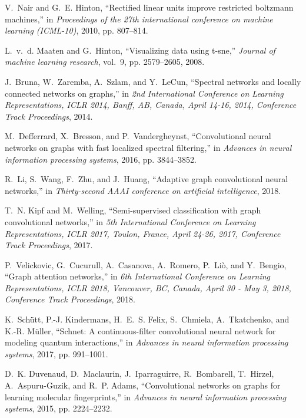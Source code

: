 \documentclass[11pt,dvipdfm]{article}
\begin{document}
\begin{thebibliography}{10}
\begin{small}
V.~Nair and G.~E. Hinton, ``Rectified linear units improve restricted boltzmann
  machines,'' in \emph{Proceedings of the 27th international conference on
  machine learning (ICML-10)}, 2010, pp. 807--814.

L.~v.~d. Maaten and G.~Hinton, ``Visualizing data using t-sne,'' \emph{Journal
  of machine learning research}, vol.~9, pp. 2579--2605, 2008.

J.~Bruna, W.~Zaremba, A.~Szlam, and Y.~LeCun, ``Spectral networks and locally
  connected networks on graphs,'' in \emph{2nd International Conference on
  Learning Representations, {ICLR} 2014, Banff, AB, Canada, April 14-16, 2014,
  Conference Track Proceedings}, 2014.

M.~Defferrard, X.~Bresson, and P.~Vandergheynst, ``Convolutional neural
  networks on graphs with fast localized spectral filtering,'' in
  \emph{Advances in neural information processing systems}, 2016, pp.
  3844--3852.

R.~Li, S.~Wang, F.~Zhu, and J.~Huang, ``Adaptive graph convolutional neural
  networks,'' in \emph{Thirty-second AAAI conference on artificial
  intelligence}, 2018.

T.~N. Kipf and M.~Welling, ``Semi-supervised classification with graph
  convolutional networks,'' in \emph{5th International Conference on Learning
  Representations, {ICLR} 2017, Toulon, France, April 24-26, 2017, Conference
  Track Proceedings}, 2017.

P.~Velickovic, G.~Cucurull, A.~Casanova, A.~Romero, P.~Li{\`{o}}, and
  Y.~Bengio, ``Graph attention networks,'' in \emph{6th International
  Conference on Learning Representations, {ICLR} 2018, Vancouver, BC, Canada,
  April 30 - May 3, 2018, Conference Track Proceedings}, 2018.

K.~Sch{\"u}tt, P.-J. Kindermans, H.~E.~S. Felix, S.~Chmiela, A.~Tkatchenko, and
  K.-R. M{\"u}ller, ``Schnet: A continuous-filter convolutional neural network
  for modeling quantum interactions,'' in \emph{Advances in neural information
  processing systems}, 2017, pp. 991--1001.

D.~K. Duvenaud, D.~Maclaurin, J.~Iparraguirre, R.~Bombarell, T.~Hirzel,
  A.~Aspuru-Guzik, and R.~P. Adams, ``Convolutional networks on graphs for
  learning molecular fingerprints,'' in \emph{Advances in neural information
  processing systems}, 2015, pp. 2224--2232.


\end{small}
\end{thebibliography}
\end{document}
